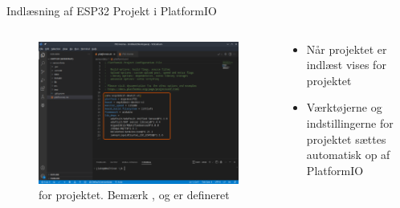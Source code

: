 \documentclass[aspectratio=169]{beamer}
\begin{document}
\begin{frame}{Indlæsning af ESP32 Projekt i PlatformIO}
\begin{columns}
	\begin{column}{0.5\textwidth}
		\begin{figure}
  			\includegraphics[width=\textwidth,keepaspectratio=true]{assets/pictures/pio-projects-6.png}
  			\caption{ for  projektet. Bemærk ,  og  er defineret}
  			\label{fig:pio-project6}
		\end{figure}
	\end{column}
	\begin{column}{0.5\textwidth}
		\begin{textBox}
			\begin{itemize}
				\item Når projektet er indlæst vises  for projektet
				\item Værktøjerne og indstillingerne for projektet sættes automatisk op af PlatformIO
			\end{itemize}
		\end{textBox}
	\end{column}
\end{columns}
\end{frame}
\end{document}
